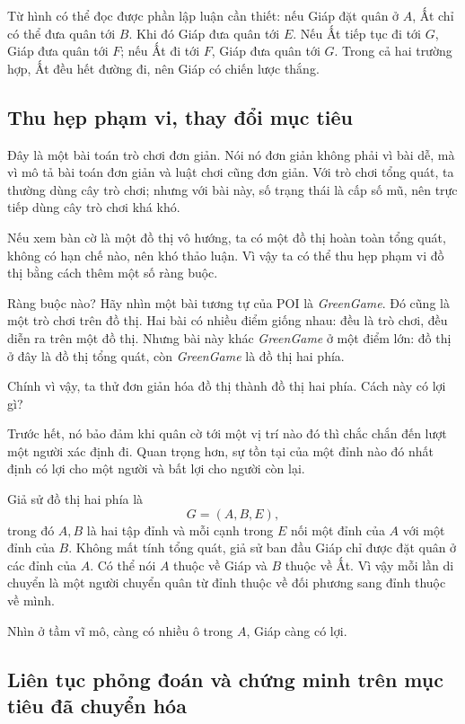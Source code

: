 \documentclass[11pt]{article}
\begin{document}
Từ hình có thể đọc được phần lập luận cần thiết: nếu Giáp đặt quân ở \(A\),
Ất chỉ có thể đưa quân tới \(B\). Khi đó Giáp đưa quân tới \(E\). Nếu Ất tiếp
tục đi tới \(G\), Giáp đưa quân tới \(F\); nếu Ất đi tới \(F\), Giáp đưa quân
tới \(G\). Trong cả hai trường hợp, Ất đều hết đường đi, nên Giáp có chiến
lược thắng.

\subsection{Thu hẹp phạm vi, thay đổi mục tiêu}

Đây là một bài toán trò chơi đơn giản. Nói nó đơn giản không phải vì bài dễ,
mà vì mô tả bài toán đơn giản và luật chơi cũng đơn giản. Với trò chơi tổng
quát, ta thường dùng cây trò chơi; nhưng với bài này, số trạng thái là cấp số
mũ, nên trực tiếp dùng cây trò chơi khá khó.

Nếu xem bàn cờ là một đồ thị vô hướng, ta có một đồ thị hoàn toàn tổng quát,
không có hạn chế nào, nên khó thảo luận. Vì vậy ta có thể thu hẹp phạm vi đồ
thị bằng cách thêm một số ràng buộc.

Ràng buộc nào? Hãy nhìn một bài tương tự của POI là \textit{GreenGame}. Đó
cũng là một trò chơi trên đồ thị. Hai bài có nhiều điểm giống nhau: đều là trò
chơi, đều diễn ra trên một đồ thị. Nhưng bài này khác \textit{GreenGame} ở
một điểm lớn: đồ thị ở đây là đồ thị tổng quát, còn \textit{GreenGame} là đồ
thị hai phía.

Chính vì vậy, ta thử đơn giản hóa đồ thị thành đồ thị hai phía. Cách này có
lợi gì?

Trước hết, nó bảo đảm khi quân cờ tới một vị trí nào đó thì chắc chắn đến lượt
một người xác định đi. Quan trọng hơn, sự tồn tại của một đỉnh nào đó nhất
định có lợi cho một người và bất lợi cho người còn lại.

Giả sử đồ thị hai phía là
\[
  G=(A,B,E),
\]
trong đó \(A,B\) là hai tập đỉnh và mỗi cạnh trong \(E\) nối một đỉnh của
\(A\) với một đỉnh của \(B\). Không mất tính tổng quát, giả sử ban đầu Giáp
chỉ được đặt quân ở các đỉnh của \(A\). Có thể nói \(A\) thuộc về Giáp và
\(B\) thuộc về Ất. Vì vậy mỗi lần di chuyển là một người chuyển quân từ đỉnh
thuộc về đối phương sang đỉnh thuộc về mình.

Nhìn ở tầm vĩ mô, càng có nhiều ô trong \(A\), Giáp càng có lợi.

\subsection{Liên tục phỏng đoán và chứng minh trên mục tiêu đã chuyển hóa}
\end{document}
